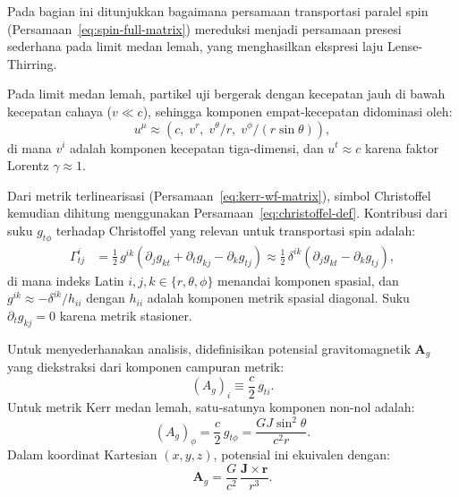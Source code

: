 Pada bagian ini ditunjukkan bagaimana persamaan transportasi paralel
spin (Persamaan~\ref{eq:spin-full-matrix}) mereduksi menjadi
persamaan presesi sederhana pada limit medan lemah,
yang menghasilkan ekspresi laju Lense-Thirring.

Pada limit medan lemah, partikel uji bergerak dengan kecepatan
jauh di bawah kecepatan cahaya ($v \ll c$),
sehingga komponen empat-kecepatan didominasi oleh:
\begin{equation}
    u^\mu \approx (c,\; v^r,\; v^\theta/r,\; v^\phi/(r\sin\theta)),
    \label{eq:u-nonrel}
\end{equation}
di mana $v^i$ adalah komponen kecepatan tiga-dimensi,
dan $u^t \approx c$ karena faktor Lorentz $\gamma \approx 1$.

Dari metrik terlinearisasi (Persamaan~\ref{eq:kerr-wf-matrix}),
simbol Christoffel kemudian dihitung menggunakan Persamaan~\eqref{eq:christoffel-def}.
Kontribusi dari suku $g_{t\phi}$ terhadap Christoffel yang relevan
untuk transportasi spin adalah:
\begin{align}
    \Gamma^i_{t j} &= \frac{1}{2}\,g^{ik}
    \left(\partial_j g_{kt} + \partial_t g_{kj} - \partial_k g_{tj}\right)
    \approx \frac{1}{2}\,\delta^{ik}
    \left(\partial_j g_{kt} - \partial_k g_{tj}\right),
    \label{eq:christoffel-wf-spatial}
\end{align}
di mana indeks Latin $i,j,k \in \{r, \theta, \phi\}$
menandai komponen spasial, dan $g^{ik} \approx -\delta^{ik}/h_{ii}$
dengan $h_{ii}$ adalah komponen metrik spasial diagonal.
Suku $\partial_t g_{kj} = 0$ karena metrik stasioner.

Untuk menyederhanakan analisis, didefinisikan potensial gravitomagnetik $\mathbf{A}_g$
yang diekstraksi dari komponen campuran metrik:
\begin{equation}
    (A_g)_i \equiv \frac{c}{2}\, g_{ti}.
    \label{eq:gravitomagnetic-potential}
\end{equation}
Untuk metrik Kerr medan lemah, satu-satunya komponen non-nol adalah:
\begin{equation}
    (A_g)_\phi = \frac{c}{2}\, g_{t\phi}
    = \frac{GJ\sin^2\!\theta}{c^2 r}.
    \label{eq:Ag-phi}
\end{equation}
Dalam koordinat Kartesian $(x, y, z)$, potensial ini ekuivalen dengan:
\begin{equation}
    \mathbf{A}_g = \frac{G}{c^2}\,\frac{\mathbf{J} \times \mathbf{r}}{r^3}.
    \label{eq:Ag-cartesian}
\end{equation}

